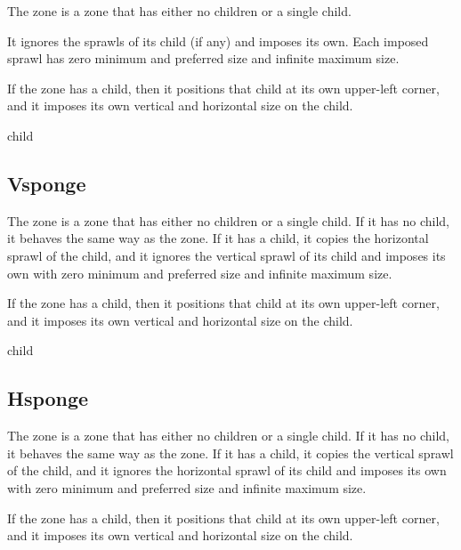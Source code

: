 The  zone is a zone that has either no children or a
single child.  

It ignores the sprawls of its child (if any) and imposes its own.
Each imposed sprawl has zero minimum and preferred size and infinite
maximum size.

If the  zone has a child, then it positions that child at
its own upper-left corner, and it imposes its own vertical and
horizontal size on the child.


 {\optional child}

\subsection{Vsponge}
\label{sec-zones-layout-vsponge}

The  zone is a zone that has either no children or a
single child.  If it has no child, it behaves the same way as the
 zone.   If it has a
child, it copies the horizontal sprawl of the child, and it ignores
the vertical sprawl of its child and imposes its own with zero minimum
and preferred size and infinite maximum size.

If the  zone has a child, then it positions that child
at its own upper-left corner, and it imposes its own vertical and
horizontal size on the child.


 {\optional child}

\subsection{Hsponge}
\label{sec-zones-layout-hsponge}

The  zone is a zone that has either no children or a single
child.  If it has no child, it behaves the same way as the
 zone.   If it has a
child, it copies the vertical sprawl of the child, and it ignores
the horizontal sprawl of its child and imposes its own with zero minimum
and preferred size and infinite maximum size.

If the  zone has a child, then it positions that child
at its own upper-left corner, and it imposes its own vertical and
horizontal size on the child.


